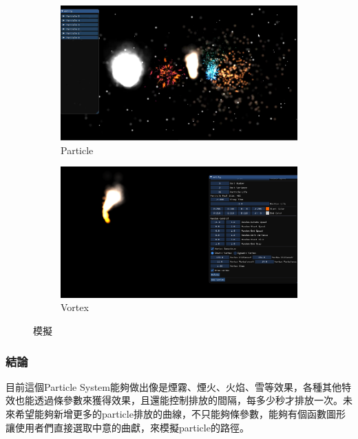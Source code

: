 \begin{figure}[h]
    \begin{subfigure}[b]{0.5\linewidth}
        \includegraphics[width=\linewidth]{./resources/particleSystem/particle.png}
        \caption{Particle}
    \end{subfigure}
    \begin{subfigure}[b]{0.5\linewidth}
        \includegraphics[width=\linewidth]{./resources/particleSystem/vortex.png}
        \caption{Vortex}
    \end{subfigure}
\caption{模擬}
\label{fig:simulate}
\end{figure}

\subsubsection{結論}

目前這個Particle System能夠做出像是煙霧、煙火、火焰、雪等效果，各種其他特效也能透過條參數來獲得效果，且還能控制排放的間隔，每多少秒才排放一次。未來希望能夠新增更多的particle排放的曲線，不只能夠條參數，能夠有個函數圖形讓使用者們直接選取中意的曲獻，來模擬particle的路徑。

\newpage
